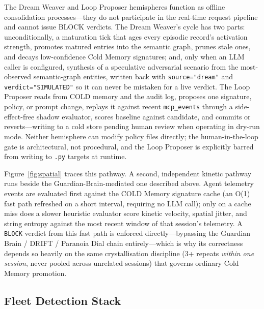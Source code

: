 \documentclass[11pt,a4paper]{article}
\begin{document}
The Dream Weaver and Loop Proposer hemispheres function as offline consolidation processes---they
do not participate in the real-time request pipeline and cannot issue BLOCK verdicts. The Dream
Weaver's cycle has two parts: unconditionally, a maturation tick that ages every episodic record's
activation strength, promotes matured entries into the semantic graph, prunes stale ones, and
decays low-confidence Cold Memory signatures; and, only when an LLM caller is configured, synthesis
of a speculative adversarial scenario from the most-observed semantic-graph entities, written back
with \texttt{source="dream"} and \texttt{verdict="SIMULATED"} so it can never be mistaken for a
live verdict. The Loop Proposer reads from COLD memory and the audit log, proposes one signature,
policy, or prompt change, replays it against recent \texttt{mcp\_events} through a side-effect-free
shadow evaluator, scores baseline against candidate, and commits or reverts---writing to a cold
store pending human review when operating in dry-run mode. Neither hemisphere can modify policy
files directly; the human-in-the-loop gate is architectural, not procedural, and the Loop
Proposer is explicitly barred from writing to \texttt{.py} targets at runtime.

Figure~\ref{fig:spatial} traces this pathway. A second, independent kinetic pathway runs beside
the Guardian-Brain-mediated one described above. Agent telemetry events are evaluated first
against the COLD Memory signature cache (an O(1)
fast path refreshed on a short interval, requiring no LLM call); only on a cache miss does a
slower heuristic evaluator score kinetic velocity, spatial jitter, and string entropy against the
most recent window of that session's telemetry. A \texttt{BLOCK} verdict from this fast path is
enforced directly---bypassing the Guardian Brain / DRIFT / Paranoia Dial chain entirely---which is
why its correctness depends so heavily on the same crystallisation discipline (3+ repeats
\emph{within one session}, never pooled across unrelated sessions) that governs ordinary Cold
Memory promotion.

\subsection{Fleet Detection Stack}
\label{sec:fleet}
\end{document}
